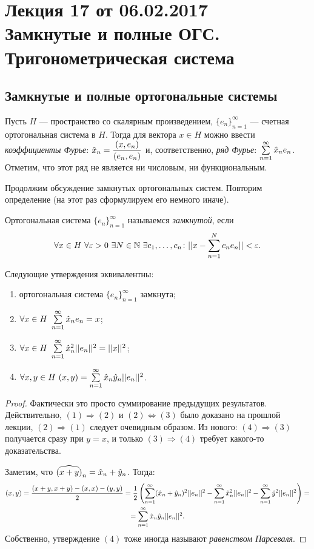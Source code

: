 \documentclass[a4paper, 12pt]{article}
\begin{document}
\newcommand{\y}{\hat{y}}
\pagestyle{fancy}
\section{Лекция 17 от 06.02.2017 \\ Замкнутые и полные ОГС. \\Тригонометрическая система}
\subsection{Замкнутые и полные ортогональные системы}
Пусть $H$ --- пространство со скалярным произведением, $\{e_n\}_{n=1}^{\infty}$  --- счетная ортогональная система в $H$. Тогда для вектора $x \in H$ можно ввести \textit{коэффициенты Фурье}: $\hat{x}_n = \dfrac{(x, e_n)}{(e_n, e_n)}$ и, соответственно, \textit{ряд Фурье}: $\sum\limits_{n=1}^{\infty} \hat{x}_ne_n $. Отметим, что этот ряд не является ни числовым, ни функциональным.

Продолжим обсуждение замкнутых ортогональных систем. Повторим определение (на этот раз сформулируем его немного иначе).
\begin{Def}
Ортогональная система $\{e_n\}_{n=1}^{\infty}$ называемся \textit{замкнутой}, если
$$
\forall x \in H \ \forall \varepsilon > 0 \ \exists N \in \mathbb{N} \ \exists c_1, \ldots, c_n \colon ||x - \sum\limits_{n=1}^{N}c_ne_n|| < \varepsilon.
$$
\end{Def}

\begin{Theorem}
Следующие утверждения эквивалентны:
\begin{enumerate}
\item ортогональная система $\{e_n\}_{n=1}^{\infty}$ замкнута;
\item $\forall x \in H \  \sum\limits_{n=1}^{\infty}\hat{x}_ne_n = x$;
\item $\forall x \in H \ \sum\limits_{n=1}^{\infty} \hat{x}^2_n||e_n||^2 = ||x||^2 $;
\item $\forall x, y \in H \ (x, y) = \sseries \x_n\y_n||e_n||^2$.
\end{enumerate}
\end{Theorem}
\begin{proof}
Фактически это просто суммирование предыдущих результатов. Действительно, $(1) \Rightarrow (2)$ и $(2) \Leftrightarrow (3)$ было доказано на прошлой лекции, $(2) \Rightarrow (1)$ следует очевидным образом.  Из нового: $(4) \Rightarrow (3)$ получается сразу при $y = x$, и только $(3) \Rightarrow (4)$ требует какого-то доказательства.

Заметим, что $\widehat{(x + y)}_n = \x_n + \y_n$. Тогда:
\begin{gather*}
(x, y) = \frac{(x + y, x+y) - (x, x) - (y, y)}{2} = \frac{1}{2} \left( \sseries (\x_n + \y_n)^2 ||e_n||^2 - \sseries \x_n^2||e_n||^2 - \sseries \y^2||e_n||^2 \right) = \\ = \sseries \x_n\y_n||e_n||^2.
\end{gather*}
Собственно, утверждение $(4)$ тоже иногда называют \textit{равенством Парсеваля}.
\end{proof}
\end{document}
